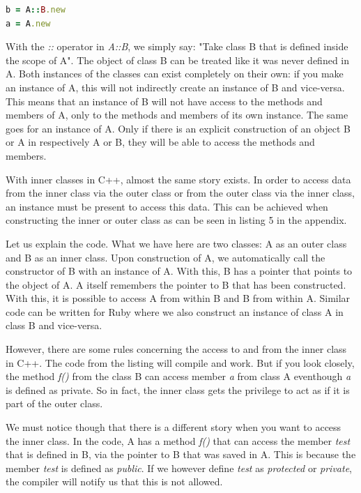\documentclass[10pt,a4paper,twocolumn]{article}
\begin{document}
\begin{lstlisting}[language=Ruby]
b = A::B.new
a = A.new
\end{lstlisting}

With the \textit{::} operator in \textit{A::B}, we simply say: "Take class B that is defined inside the scope of A". The object of class B can be treated like it was never defined in A. Both instances of the classes can exist completely on their own: if you make an instance of A, this will not indirectly create an instance of B and vice-versa. This means that an instance of B will not have access to the methods and members of A, only to the methods and members of its own instance. The same goes for an instance of A. Only if there is an explicit construction of an object B or A in respectively A or B, they will be able to access the methods and members.

With inner classes in C++, almost the same story exists. In order to access data from the inner class via the outer class or from the outer class via the inner class, an instance must be present to access this data. This can be achieved when constructing the inner or outer class as can be seen in listing 5 in the appendix.

Let us explain the code. What we have here are two classes: A as an outer class and B as an inner class. Upon construction of A, we automatically call the constructor of B with an instance of A. With this, B has a pointer that points to the object of A. A itself remembers the pointer to B that has been constructed. With this, it is possible to access A from within B and B from within A. Similar code can be written for Ruby where we also construct an instance of class A in class B and vice-versa.

However, there are some rules concerning the access to and from the inner class in C++. The code from the listing will compile and work. But if you look closely, the method \textit{f()} from the class B can access member \textit{a} from class A eventhough \textit{a} is defined as private. So in fact, the inner class gets the privilege to act as if it is part of the outer class.

We must notice though that there is a different story when you want to access the inner class. In the code, A has a method \textit{f()} that can access the member \textit{test} that is defined in B, via the pointer to B that was saved in A. This is because the member \textit{test} is defined as \textit{public}. If we however define \textit{test} as \textit{protected} or \textit{private}, the compiler will notify us that this is not allowed.
\end{document}
